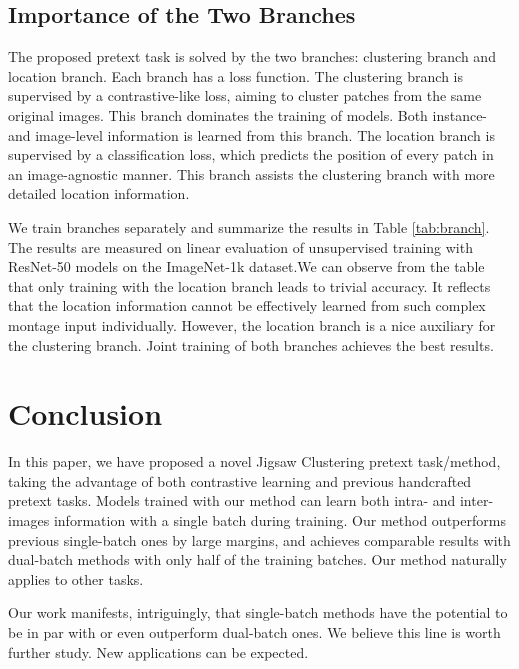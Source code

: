 \documentclass[final]{cvpr}
\begin{document}
\subsection{Importance of the Two Branches}
The proposed pretext task is solved by the two branches: clustering branch and location branch. Each branch has a loss function. The clustering branch is supervised by a contrastive-like loss, aiming to cluster patches from the same original images. This branch dominates the training of models. Both instance- and image-level information is learned from this branch. The location branch is supervised by a classification loss, which predicts the position of every patch in an image-agnostic manner. This branch assists the clustering branch with more detailed location information. 

We train branches separately and summarize the results in Table \ref{tab:branch}. The results are measured on linear evaluation of unsupervised training with ResNet-50 models on the ImageNet-1k dataset.We can observe from the table that only training with the location branch leads to trivial accuracy. It reflects that the location information cannot be effectively learned from such complex montage input individually. However, the location branch is a nice auxiliary for the clustering branch. Joint training of both branches achieves the best results.

\section{Conclusion}
In this paper, we have proposed a novel Jigsaw Clustering pretext task/method, taking the advantage of both contrastive learning and previous handcrafted pretext tasks. Models trained with our method can learn both intra- and inter-images information with a single batch during training. Our method outperforms previous single-batch ones by large margins, and achieves comparable results with dual-batch methods with only half of the training batches. Our method naturally applies to other tasks. 

Our work manifests, intriguingly, that single-batch methods have the potential to be in par with or even outperform dual-batch ones. We believe this line is worth further study. New applications can be expected.


{\small


}
\end{document}
